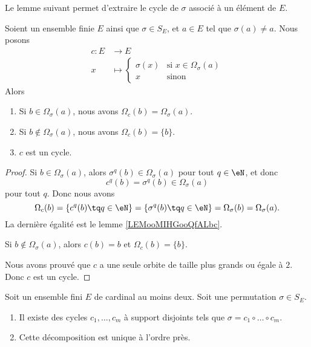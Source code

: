 Le lemme suivant permet d'extraire le cycle de \( \sigma\) associé à un élément de \( E\).
\begin{lemma}        \label{LEMooFFTBooCZsaFu}
	Soient un ensemble finie \( E\) ainsi que \( \sigma\in S_E\), et \( a\in E\) tel que \( \sigma(a)\neq a\). Nous posons
	\begin{equation}
		\begin{aligned}
			c\colon E & \to E                                                  \\
			x         & \mapsto \begin{cases}
				                    \sigma(x) & \text{si } x\in \Omega_{\sigma}(a) \\
				                    x         & \text{sinon }
			                    \end{cases}
		\end{aligned}
	\end{equation}
	Alors
	\begin{enumerate}
		\item
		      Si \( b\in \Omega_{\sigma}(a)\), nous avons \( \Omega_{c}(b)=\Omega_{\sigma}(a)\).
		\item
		      Si \( b\notin \Omega_{\sigma}(a)\), nous avons \( \Omega_{c}(b)=\{ b \}\).
		\item
		      \( c\) est un cycle.
	\end{enumerate}
\end{lemma}

\begin{proof}
	Si \( b\in \Omega_{\sigma}(a)\), alors \( \sigma^q(b)\in \Omega_{\sigma}(a)\) pour tout \( q\in \eN\), et donc
	\begin{equation}
		c^q(b)=\sigma^q(b)\in\Omega_{\sigma}(a)
	\end{equation}
	pour tout \( q\). Donc nous avons
	\begin{equation}
		\Omega_c(b)=\{ c^q(b)\tq q\in \eN \}=\{ \sigma^q(b)\tq q\in \eN \}=\Omega_{\sigma}(b)=\Omega_{\sigma}(a).
	\end{equation}
	La dernière égalité est le lemme \ref{LEMooMIHGooQfALbc}.

	Si \( b\notin\Omega_{\sigma}(a)\), alors \( c(b)=b\) et \( \Omega_c(b)=\{ b \}\).

	Nous avons prouvé que \( c\) a une seule orbite de taille plus grands ou égale à \( 2\). Donc \( c\) est un cycle.
\end{proof}


\begin{theorem}
	Soit un ensemble fini \( E\) de cardinal au moins deux. Soit une permutation \( \sigma\in S_E\).
	\begin{enumerate}
		\item Il existe des cycles \( c_1,\ldots, c_m\) à support disjoints tels que \( \sigma=c_1\circ\ldots \circ c_m\).
		\item
		      Cette décomposition est unique à l'ordre près.
	\end{enumerate}
\end{theorem}

